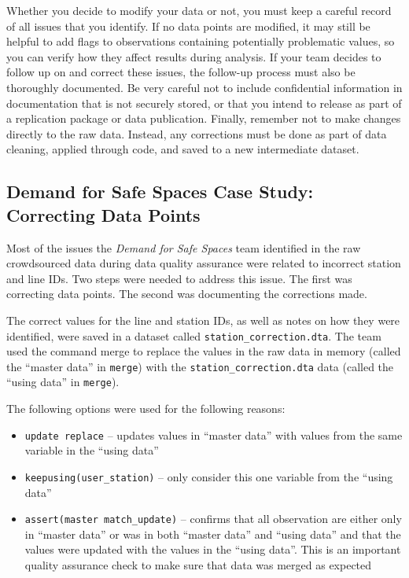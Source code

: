 \documentclass[
]{book}
\providecommand{\tightlist}{%
  \setlength{\itemsep}{0pt}\setlength{\parskip}{0pt}}
\begin{document}
Whether you decide to modify your data or not,
you must keep a careful record of all issues that you identify.
If no data points are modified,
it may still be helpful to add flags to observations containing
potentially problematic values,
so you can verify how they affect results during analysis.
If your team decides to follow up on and correct these issues,
the follow-up process must also be thoroughly documented.
Be very careful not to include confidential information in documentation that is not securely stored,
or that you intend to release as part of a replication package or data publication.
Finally, remember not to make changes directly to the raw data.
Instead, any corrections must be done as part of data cleaning,
applied through code, and saved to a new intermediate dataset.

\begin{ex}
\hypertarget{demand-for-safe-spaces-case-study-correcting-data-points}{%
\subsection{Demand for Safe Spaces Case Study: Correcting Data Points}\label{demand-for-safe-spaces-case-study-correcting-data-points}}

Most of the issues the \emph{Demand for Safe Spaces} team identified in the raw crowdsourced data during data quality assurance were related to incorrect station and line IDs. Two steps were needed to address this issue. The first was correcting data points. The second was documenting the corrections made.

The correct values for the line and station IDs, as well as notes on how they were identified, were saved in a dataset called \texttt{station\_correction.dta}. The team used the command merge to replace the values in the raw data in memory (called the ``master data'' in \texttt{merge}) with the \texttt{station\_correction.dta} data (called the ``using data'' in \texttt{merge}).

The following options were used for the following reasons:

\begin{itemize}
\tightlist
\item
  \texttt{update\ replace} -- updates values in ``master data'' with values from the same variable in the ``using data''
\item
  \texttt{keepusing(user\_station)} -- only consider this one variable from the ``using data''
\item
  \texttt{assert(master\ match\_update)} -- confirms that all observation are either only in ``master data'' or was in both ``master data'' and ``using data'' and that the values were updated with the values in the ``using data''. This is an important quality assurance check to make sure that data was merged as expected
\end{itemize}


\end{ex}
\end{document}
